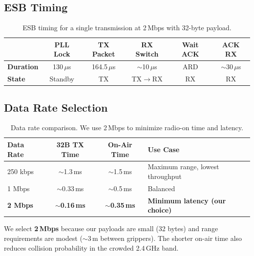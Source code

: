 \documentclass[11pt,a4paper]{article}
\begin{document}
\subsection{ESB Timing}

\begin{table}[htbp]
\centering
\caption{ESB timing for a single transmission at 2\,Mbps with 32-byte payload.}
\begin{tabular}{l c c c c c}
\toprule
 & PLL Lock & TX Packet & RX Switch & Wait ACK & ACK RX \\
\midrule
\textbf{Duration} & \cellcolor{nodeblue}130\,$\mu$s & \cellcolor{nodegreen}164.5\,$\mu$s & \cellcolor{nodeorange}${\sim}$10\,$\mu$s & \cellcolor{nodeyellow}ARD & \cellcolor{nodeblue}${\sim}$30\,$\mu$s \\
\textbf{State} & \cellcolor{nodeblue}Standby & \cellcolor{nodegreen}TX & \cellcolor{nodeorange}TX$\to$RX & \cellcolor{nodeyellow}RX & \cellcolor{nodeblue}RX \\
\bottomrule
\end{tabular}
\label{tab:esb-timing}
\end{table}

\subsection{Data Rate Selection}

\begin{table}[htbp]
\centering
\caption{Data rate comparison. We use 2\,Mbps to minimize radio-on time and latency.}
\begin{tabular}{l c c l}
\toprule
\textbf{Data Rate} & \textbf{32B TX Time} & \textbf{On-Air Time} & \textbf{Use Case} \\
\midrule
250 kbps & ${\sim}$1.3\,ms & ${\sim}$1.5\,ms & Maximum range, lowest throughput \\
1 Mbps & ${\sim}$0.33\,ms & ${\sim}$0.5\,ms & Balanced \\
\textbf{2 Mbps} & \textbf{${\sim}$0.16\,ms} & \textbf{${\sim}$0.35\,ms} & \textbf{Minimum latency (our choice)} \\
\bottomrule
\end{tabular}
\label{tab:data-rates}
\end{table}

We select \textbf{2\,Mbps} because our payloads are small (32 bytes) and range requirements are modest (${\sim}$3\,m between grippers). The shorter on-air time also reduces collision probability in the crowded 2.4\,GHz band.
\end{document}

